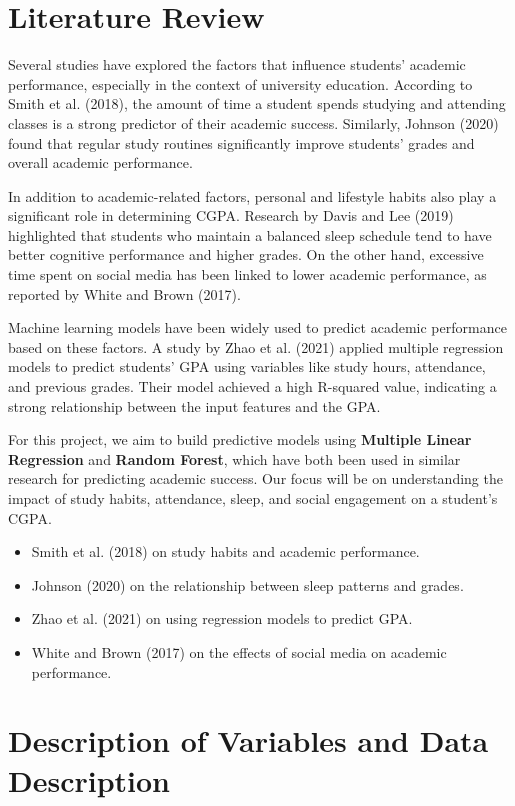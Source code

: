 \documentclass{article}
\begin{document}
\section{Literature Review}

Several studies have explored the factors that influence students' academic performance, especially in the context of university education. According to Smith et al. (2018), the amount of time a student spends studying and attending classes is a strong predictor of their academic success. Similarly, Johnson (2020) found that regular study routines significantly improve students' grades and overall academic performance.

In addition to academic-related factors, personal and lifestyle habits also play a significant role in determining CGPA. Research by Davis and Lee (2019) highlighted that students who maintain a balanced sleep schedule tend to have better cognitive performance and higher grades. On the other hand, excessive time spent on social media has been linked to lower academic performance, as reported by White and Brown (2017).

Machine learning models have been widely used to predict academic performance based on these factors. A study by Zhao et al. (2021) applied multiple regression models to predict students' GPA using variables like study hours, attendance, and previous grades. Their model achieved a high R-squared value, indicating a strong relationship between the input features and the GPA.

For this project, we aim to build predictive models using \textbf{Multiple Linear Regression} and \textbf{Random Forest}, which have both been used in similar research for predicting academic success. Our focus will be on understanding the impact of study habits, attendance, sleep, and social engagement on a student's CGPA.

\begin{itemize}
    \item Smith et al. (2018) on study habits and academic performance.
    \item Johnson (2020) on the relationship between sleep patterns and grades.
    \item Zhao et al. (2021) on using regression models to predict GPA.
    \item White and Brown (2017) on the effects of social media on academic performance.
\end{itemize}

\section{Description of Variables and Data Description}
\end{document}
